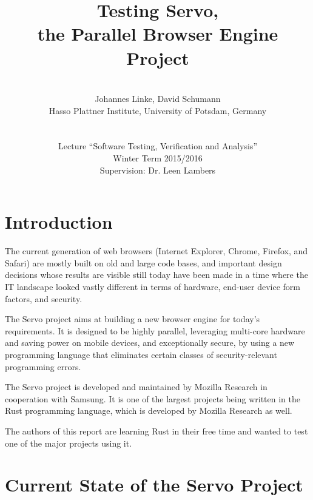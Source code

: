 \documentclass{scrartcl}
\begin{document}
\title{Testing Servo,\\ the Parallel Browser Engine Project}
\author{\\ Johannes Linke, David Schumann\\ Hasso Plattner Institute, University of Potsdam, Germany\\ \\ \\
Lecture ``Software Testing, Verification and Analysis''\\ Winter Term 2015/2016\\ Supervision: Dr. Leen Lambers \vspace{300px}}

\maketitle
\thispagestyle{empty}

\newpage

\tableofcontents

\newpage



\section{Introduction}

The current generation of web browsers (Internet Explorer, Chrome, Firefox, and Safari) are mostly built on old and large code bases, and important design decisions whose results are visible still today have been made in a time where the IT landscape looked vastly different in terms of hardware, end-user device form factors, and security.

The Servo project aims at building a new browser engine for today's requirements. It is designed to be highly parallel, leveraging multi-core hardware and saving power on mobile devices, and exceptionally secure, by using a new programming language that eliminates certain classes of security-relevant programming errors.

The Servo project is developed and maintained by Mozilla Research in cooperation with Samsung. It is one of the largest projects being written in the Rust programming language, which is developed by Mozilla Research as well.

The authors of this report are learning Rust in their free time and wanted to test one of the major projects using it.


\newpage


\section{Current State of the Servo Project}
\end{document}
